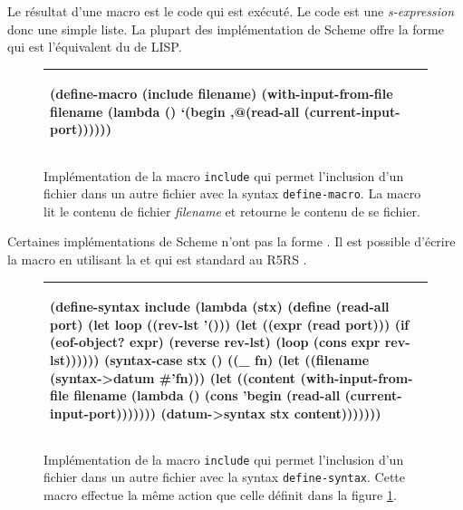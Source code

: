 Le résultat d'une macro est le code qui est exécuté. Le code est une
\textit{s-expression} donc une simple liste. La plupart des implémentation
de Scheme offre la forme  qui est l'équivalent du
 de LISP.


\begin{figure}[ht]
  \begin{tabular}{|l|}\hline
\begin{mplisting}{0.7}
(define-macro (include filename)
  (with-input-from-file
    filename
    (lambda ()
      `(begin
        ,@(read-all (current-input-port))))))
\end{mplisting}\\\hline
\end{tabular}

  \caption{Implémentation de la macro \texttt{include} qui permet l'inclusion
  d'un fichier dans un autre fichier avec la syntax \texttt{define-macro}.  La
  macro lit le contenu de fichier \textit{filename} et retourne le contenu de
  se fichier.}

  \label{fig:macro_include}
\end{figure}

Certaines implémentations de Scheme n'ont pas la forme
. Il est possible d'écrire la macro
 en utilisant la 
et  qui est standard au R5RS
\cite{Scheme:R5RS}.

\begin{figure}[ht]
  \begin{tabular}{|l|}\hline
\begin{mplisting}{0.8}
(define-syntax include
  (lambda (stx)
    (define (read-all port)
      (let loop ((rev-lst '()))
        (let ((expr (read port)))
          (if (eof-object? expr)
            (reverse rev-lst)
            (loop (cons expr rev-lst))))))
    (syntax-case stx ()
      ((_ fn)
       (let ((filename (syntax->datum #'fn)))
         (let ((content
                 (with-input-from-file
                    filename
                    (lambda ()
                      (cons
                        'begin
                        (read-all (current-input-port)))))))
           (datum->syntax stx content)))))))

\end{mplisting}\\\hline
\end{tabular}

  \caption{Implémentation de la macro \texttt{include} qui permet l'inclusion
  d'un fichier dans un autre fichier avec la syntax \texttt{define-syntax}.
  Cette macro effectue la même action que celle définit dans la figure
  \ref{fig:macro_include}.}

\end{figure}



